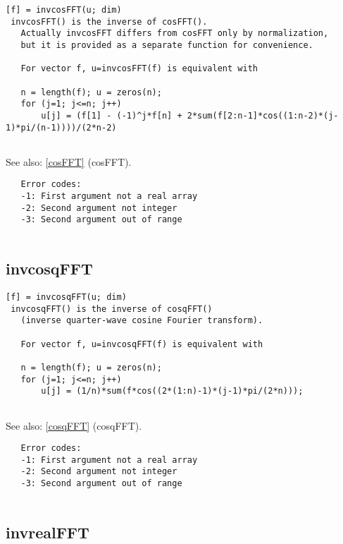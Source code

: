 \documentclass[a4paper]{article}
\begin{document}
\begin{tscreen}
\begin{verbatim}
[f] = invcosFFT(u; dim)
 invcosFFT() is the inverse of cosFFT().
   Actually invcosFFT differs from cosFFT only by normalization,
   but it is provided as a separate function for convenience.
   
   For vector f, u=invcosFFT(f) is equivalent with

   n = length(f); u = zeros(n);
   for (j=1; j<=n; j++)
       u[j] = (f[1] - (-1)^j*f[n] + 2*sum(f[2:n-1]*cos((1:n-2)*(j-1)*pi/(n-1))))/(2*n-2)
   
\end{verbatim}

See also: \ref{cosFFT} {(cosFFT)}.
\begin{verbatim}
   Error codes:
   -1: First argument not a real array
   -2: Second argument not integer
   -3: Second argument out of range
   
\end{verbatim}
\end{tscreen}





\subsection{invcosqFFT\label{invcosqFFT}}

\begin{tscreen}
\begin{verbatim}
[f] = invcosqFFT(u; dim)
 invcosqFFT() is the inverse of cosqFFT()
   (inverse quarter-wave cosine Fourier transform).
   
   For vector f, u=invcosqFFT(f) is equivalent with

   n = length(f); u = zeros(n);
   for (j=1; j<=n; j++)
       u[j] = (1/n)*sum(f*cos((2*(1:n)-1)*(j-1)*pi/(2*n)));
   
\end{verbatim}

See also: \ref{cosqFFT} {(cosqFFT)}.
\begin{verbatim}
   Error codes:
   -1: First argument not a real array
   -2: Second argument not integer
   -3: Second argument out of range
   
\end{verbatim}
\end{tscreen}





\subsection{invrealFFT\label{invrealFFT}}
\end{document}
